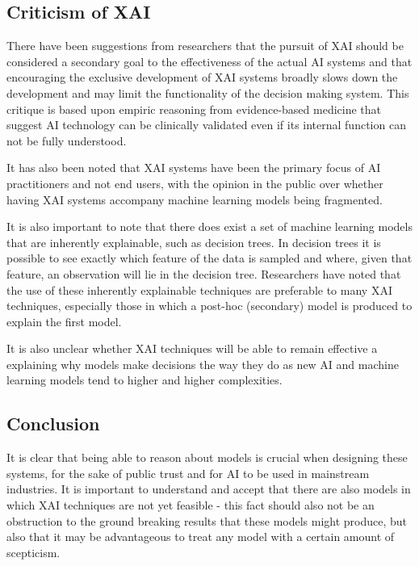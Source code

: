 \documentclass{article}
\begin{document}
\subsection{Criticism of XAI}

There have been suggestions from researchers that the pursuit of XAI should be considered a secondary goal to the effectiveness of the actual AI systems and that encouraging the exclusive development of XAI systems broadly slows down the development and may limit the functionality of the decision making system. This critique is based upon empiric reasoning from evidence-based medicine that suggest AI technology can be clinically validated even if its internal function can not be fully understood. 

It has also been noted that XAI systems have been the primary focus of AI practitioners and not end users, with the opinion in the public over whether having XAI systems accompany machine learning models being fragmented. 

It is also important to note that there does exist a set of machine learning models that are inherently explainable, such as decision trees. In decision trees it is possible to see exactly which feature of the data is sampled and where, given that feature, an observation will lie in the decision tree. Researchers have noted that the use of these inherently explainable techniques are preferable to many XAI techniques, especially those in which a post-hoc (secondary) model is produced to explain the first model. 

It is also unclear whether XAI techniques will be able to remain effective a explaining why models make decisions the way they do as new AI and machine learning models tend to higher and higher complexities. 

\subsection{Conclusion}

It is clear that being able to reason about models is crucial when designing these systems, for the sake of public trust and for AI to be used in mainstream industries. It is important to understand and accept that there are also models in which XAI techniques are not yet feasible - this fact should also not be an obstruction to the ground breaking results that these models might produce, but also that it may be advantageous to treat any model with a certain amount of scepticism. 


 
 
 
 
 
 
 

 






















\newpage 
\printbibliography
\end{document}

